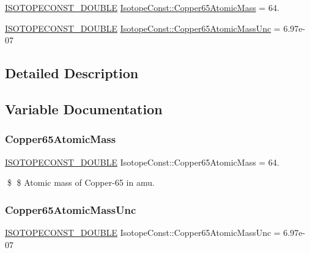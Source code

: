 \begin{DoxyCompactItemize}
\item 
\mbox{\hyperlink{group___isotope_const-_macros_ga8f45a7272ce02c0b4c65c44636ed719a}{I\+S\+O\+T\+O\+P\+E\+C\+O\+N\+S\+T\+\_\+\+D\+O\+U\+B\+LE}} \mbox{\hyperlink{group___isotope_const-_copper-_cu65_ga4efef316e1f7f95b80785cf78b2a68e5}{Isotope\+Const\+::\+Copper65\+Atomic\+Mass}} = 64.
\item 
\mbox{\hyperlink{group___isotope_const-_macros_ga8f45a7272ce02c0b4c65c44636ed719a}{I\+S\+O\+T\+O\+P\+E\+C\+O\+N\+S\+T\+\_\+\+D\+O\+U\+B\+LE}} \mbox{\hyperlink{group___isotope_const-_copper-_cu65_ga0a15c070e42051641f828a2300fb075f}{Isotope\+Const\+::\+Copper65\+Atomic\+Mass\+Unc}} = 6.\+97e-\/07
\end{DoxyCompactItemize}


\subsection{Detailed Description}


\subsection{Variable Documentation}
\mbox{\label{group___isotope_const-_copper-_cu65_ga4efef316e1f7f95b80785cf78b2a68e5}} 
\subsubsection{\texorpdfstring{Copper65\+Atomic\+Mass}{Copper65AtomicMass}}
{\footnotesize\ttfamily \mbox{\hyperlink{group___isotope_const-_macros_ga8f45a7272ce02c0b4c65c44636ed719a}{I\+S\+O\+T\+O\+P\+E\+C\+O\+N\+S\+T\+\_\+\+D\+O\+U\+B\+LE}} Isotope\+Const\+::\+Copper65\+Atomic\+Mass = 64.}

\$ \$ Atomic mass of Copper-\/65 in amu. \mbox{\label{group___isotope_const-_copper-_cu65_ga0a15c070e42051641f828a2300fb075f}} 
\subsubsection{\texorpdfstring{Copper65\+Atomic\+Mass\+Unc}{Copper65AtomicMassUnc}}
{\footnotesize\ttfamily \mbox{\hyperlink{group___isotope_const-_macros_ga8f45a7272ce02c0b4c65c44636ed719a}{I\+S\+O\+T\+O\+P\+E\+C\+O\+N\+S\+T\+\_\+\+D\+O\+U\+B\+LE}} Isotope\+Const\+::\+Copper65\+Atomic\+Mass\+Unc = 6.\+97e-\/07}

